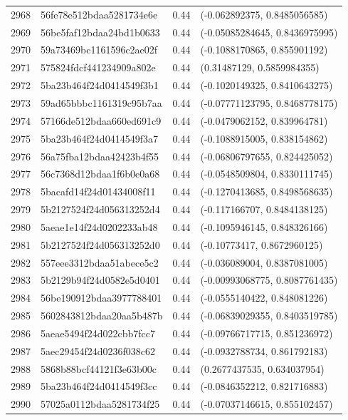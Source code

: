 \begin{table}[ht]
\begin{tabular}{rlrl}
  2968 & 56fe78e512bdaa5281734e6e & 0.44 & (-0.062892375, 0.8485056585) \\ 
  2969 & 56be5faf12bdaa24bd1b0633 & 0.44 & (-0.05085284645, 0.8436975995) \\ 
  2970 & 59a73469bc1161596c2ae02f & 0.44 & (-0.1088170865, 0.855901192) \\ 
  2971 & 575824fdcf441234909a802e & 0.44 & (0.31487129, 0.5859984355) \\ 
  2972 & 5ba23b464f24d0414549f3b1 & 0.44 & (-0.1020149325, 0.8410643275) \\ 
  2973 & 59ad65bbbc1161319c95b7aa & 0.44 & (-0.07771123795, 0.8468778175) \\ 
  2974 & 57166de512bdaa660ed691c9 & 0.44 & (-0.0479062152, 0.839964781) \\ 
  2975 & 5ba23b464f24d0414549f3a7 & 0.44 & (-0.1088915005, 0.838154862) \\ 
  2976 & 56a75fba12bdaa42423b4f55 & 0.44 & (-0.06806797655, 0.824425052) \\ 
  2977 & 56c7368d12bdaa1f6b0e0a68 & 0.44 & (-0.0548509804, 0.8330111745) \\ 
  2978 & 5bacafd14f24d01434008f11 & 0.44 & (-0.1270413685, 0.8498568635) \\ 
  2979 & 5b2127524f24d056313252d4 & 0.44 & (-0.117166707, 0.8484138125) \\ 
  2980 & 5aeae1e14f24d0202233ab48 & 0.44 & (-0.1095946145, 0.848326166) \\ 
  2981 & 5b2127524f24d056313252d0 & 0.44 & (-0.10773417, 0.8672960125) \\ 
  2982 & 557eee3312bdaa51abece5c2 & 0.44 & (-0.036089004, 0.8387081005) \\ 
  2983 & 5b2129b94f24d0582e5d0401 & 0.44 & (-0.00993068775, 0.8087761435) \\ 
  2984 & 56be190912bdaa3977788401 & 0.44 & (-0.0555140422, 0.848081226) \\ 
  2985 & 5602843812bdaa20aa5b487b & 0.44 & (-0.06839029355, 0.8403519785) \\ 
  2986 & 5aeae5494f24d022cbb7fcc7 & 0.44 & (-0.09766717715, 0.851236972) \\ 
  2987 & 5aec29454f24d0236f038c62 & 0.44 & (-0.0932788734, 0.861792183) \\ 
  2988 & 5868b88bcf44121f3e63b00c & 0.44 & (0.2677437535, 0.634037954) \\ 
  2989 & 5ba23b464f24d0414549f3cc & 0.44 & (-0.0846352212, 0.821716883) \\ 
  2990 & 57025a0112bdaa5281734f25 & 0.44 & (-0.07037146615, 0.855102457) \\ 

\end{tabular}
\end{table}
